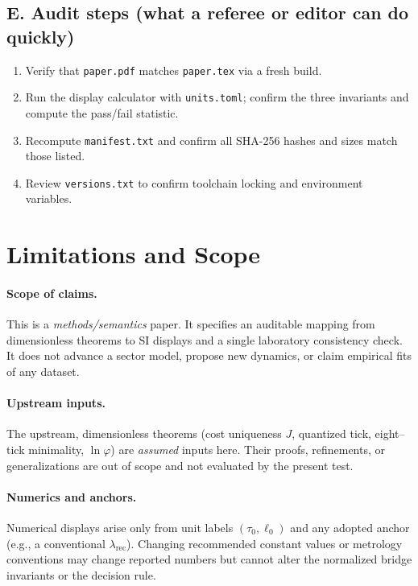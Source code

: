 \documentclass[11pt]{article}
\begin{document}
\subsection*{E. Audit steps (what a referee or editor can do quickly)}
\begin{enumerate}
  \item Verify that \texttt{paper.pdf} matches \texttt{paper.tex} via a fresh build.
  \item Run the display calculator with \texttt{units.toml}; confirm the three invariants and compute the pass/fail statistic.
  \item Recompute \texttt{manifest.txt} and confirm all SHA-256 hashes and sizes match those listed.
  \item Review \texttt{versions.txt} to confirm toolchain locking and environment variables.
\end{enumerate}

\section{Limitations and Scope}

\paragraph{Scope of claims.}
This is a \emph{methods/semantics} paper. It specifies an auditable mapping from dimensionless theorems to SI displays and a single laboratory consistency check. It does not advance a sector model, propose new dynamics, or claim empirical fits of any dataset.

\paragraph{Upstream inputs.}
The upstream, dimensionless theorems (cost uniqueness \(J\), quantized tick, eight–tick minimality, \(\ln\varphi\)) are \emph{assumed} inputs here. Their proofs, refinements, or generalizations are out of scope and not evaluated by the present test.

\paragraph{Numerics and anchors.}
Numerical displays arise only from unit labels \((\tau_{0},\ell_{0})\) and any adopted anchor (e.g., a conventional \(\lambda_{\mathrm{rec}}\)). Changing recommended constant values or metrology conventions may change reported numbers but cannot alter the normalized bridge invariants or the decision rule.
\end{document}

